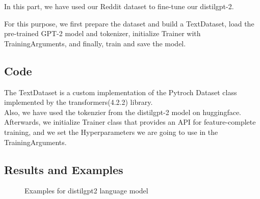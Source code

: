 \documentclass[12pt, a4paper]{article}
\begin{document}
\vspace{5mm}
In this part, we have used our Reddit dataset to fine-tune our distilgpt-2.

For this purpose, we first prepare the dataset and build a TextDataset, load the pre-trained GPT-2 model and tokenizer, initialize Trainer with TrainingArguments, and finally, train and save the model. 

\subsection{Code}
The TextDataset is a custom implementation of the Pytroch Dataset class implemented by the transformers(4.2.2) library.
\\Also, we have used the tokenzier from the distilgpt-2 model on huggingface.
\\Afterwards, we initialize Trainer class that provides an API for feature-complete training, and we set the Hyperparameters we are going to use in the TrainingArguments.

\subsection{Results and Examples}
\begin{figure}[H]
	\caption{Examples for distilgpt2 language model}
	\label{finetune-lm_examples.png}
\end{figure}
%


\newpage
\end{document}

